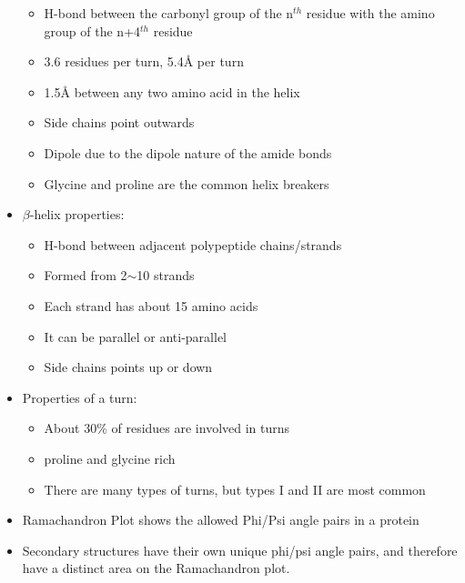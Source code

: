 \begin{itemize}
		\begin{itemize}
			\item H-bond between the carbonyl group of the n$^{th}$ residue with the amino group of the n+4$^{th}$ residue
			\item 3.6 residues per turn, 5.4\AA{} per turn
			\item 1.5\AA{} between any two amino acid in the helix
			\item Side chains point outwards
			\item Dipole due to the dipole nature of the amide bonds
			\item Glycine and proline are the common helix breakers
		\end{itemize}
	\item $\beta$-helix properties:
		\begin{itemize}
			\item H-bond between adjacent polypeptide chains/strands
			\item Formed from 2$\sim$10 strands
			\item Each strand has about 15 amino acids
			\item It can be parallel or anti-parallel
			\item Side chains points up or down
		\end{itemize}
	\item Properties of a turn:
		\begin{itemize}
			\item About 30\% of residues are involved in turns
			\item proline and glycine rich
			\item There are many types of turns, but types I and II are most common
		\end{itemize}
	\item Ramachandron Plot shows the allowed Phi/Psi angle pairs in a protein
	\item Secondary structures have their own unique phi/psi angle pairs, and therefore have a distinct area on the Ramachandron plot.
\end{itemize}
